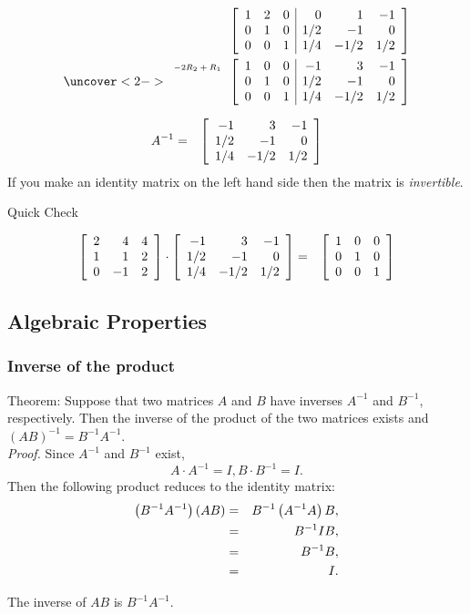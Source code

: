 \begin{frame}
  \begin{eqnarray*}
      \stateThree{~}{~}{~}
      \startRowOpsThree
      \oneRowOpsThree{1}{2}{0}{0}{1}{-1}
      \oneRowOpsThree{0}{1}{0}{1/2}{-1}{0}
      \oneRowOpsThree{0}{0}{1}{1/4}{-1/2}{1/2}
      \stopRowOps \\
    \uncover<2->
    {
      \stateThree{-2R_2+R_1}{~}{~}
      \startRowOpsThree
      \oneRowOpsThree{1}{0}{0}{-1}{3}{-1}
      \oneRowOpsThree{0}{1}{0}{1/2}{-1}{0}
      \oneRowOpsThree{0}{0}{1}{1/4}{-1/2}{1/2}
      \stopRowOps 
    }
  \end{eqnarray*}

  {
    \begin{eqnarray*}
      A^{-1} & =  & \left[ \begin{array}{rrr} -1 & 3 & -1 \\ 1/2 & -1 & 0 \\ 1/4 & -1/2 & 1/2 \end{array} \right]
    \end{eqnarray*}
  }
  {
   If you  make an identity matrix on the left hand side then the
   matrix is \textbf{} \textit{invertible}.
  }
\end{frame}

\begin{frame}{Quick Check}

  \begin{eqnarray*}
    \left[ \begin{array}{rrr}  2 & 4 &  4 \\   1 &  1 & 2 \\   0 &   -1 &   2 \end{array} \right] \cdot 
    \left[ \begin{array}{rrr} -1 & 3 & -1 \\ 1/2 & -1 & 0 \\ 1/4 & -1/2 & 1/2 \end{array} \right] & = & 
    \left[ \begin{array}{rrr} 1 & 0 & 0 \\ 0 & 1 & 0 \\ 0 & 0 & 1 \end{array} \right]
  \end{eqnarray*}
  
\end{frame}

\subsection{Algebraic Properties}

\begin{frame}
  \frametitle{Inverse of the product}

  {\color{red}Theorem:} Suppose that two matrices $A$ and $B$ have
  inverses $A^{-1}$ and $B^{-1}$, respectively.  Then the inverse of
  the product of the two matrices exists and
  {\color{orange}$(AB)^{-1} = B^{-1}A^{-1}$}.\\

  \textit{{\color{blue}Proof.}} Since $A^{-1}$ and $B^{-1}$ exist,  
   \begin{equation*} 
     A \cdot A^{-1} = I, B \cdot B^{-1}  =  I. 
   \end{equation*}
   Then the following product reduces to the identity matrix:
   \begin{eqnarray*}
    \left( B^{-1} A^{-1} \right) \left( A B \right) & = & B^{-1} \left( A^{-1} A \right) B, \\
    & = & B^{-1} I B, \\
    & = & B^{-1} B, \\
    & = & I.
  \end{eqnarray*}

  The inverse of $AB$ is $B^{-1}A^{-1}$.

\end{frame}


